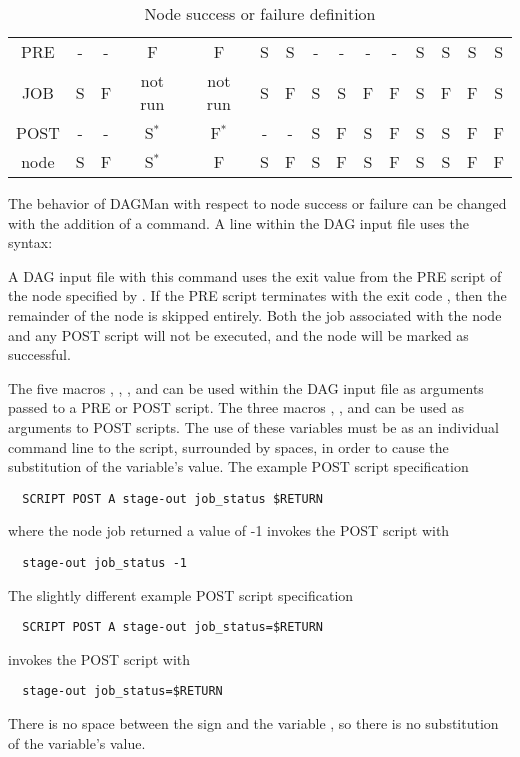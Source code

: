 \begin{itemize}
\begin{center}
\begin{table}[hbt]
\begin{tabular}{|c||cccccccccccccc|} \hline
PRE   & - & - & F          & F          & S & S & - & - & - & - & S & S & S & S  \\
JOB   & S & F & not run    & not run    & S & F & S & S & F & F & S & F & F & S  \\
POST  & - & - & S${}^\ast$ & F${}^\ast$ & - & - & S & F & S & F & S & S & F & F  \\
\hline \hline
node  & S & F & S${}^\ast$ & F          & S & F & S & F & S & F & S & S & F & F  \\
\hline
\end{tabular}
\caption{\label{Node-success-failure}Node success or failure definition }
\end{table}
\end{center}

The behavior of DAGMan with respect to node success or failure can be changed 
with the addition of a  command. 
A  line within the DAG input file uses the syntax: 

  

A DAG input file with this command uses the exit value from the
PRE script of the node specified by . 
If the PRE script terminates with the exit code ,
then the remainder of the node is skipped entirely.  
Both the job associated with the node and
any POST script will not be executed,
and the node will be marked as successful.


The five macros , , , 
 and  can be used within the
DAG input file as arguments passed to a PRE or POST script. 
The three macros , , 
and  can
be used as arguments to POST scripts.
The use of these variables must be as an individual command
line  to the script,
surrounded by spaces, in order to cause the substitution of the
variable's value.
The example POST script specification
\begin{verbatim}
  SCRIPT POST A stage-out job_status $RETURN 
\end{verbatim}
where the node job returned a value of -1
invokes the POST script with
\begin{verbatim}
  stage-out job_status -1
\end{verbatim}
The slightly different example POST script specification
\begin{verbatim}
  SCRIPT POST A stage-out job_status=$RETURN 
\end{verbatim}
invokes the POST script with
\begin{verbatim}
  stage-out job_status=$RETURN
\end{verbatim}
There is no space between the \Expr{=} sign and the variable ,
so there is no substitution of the variable's value.


\end{itemize}

